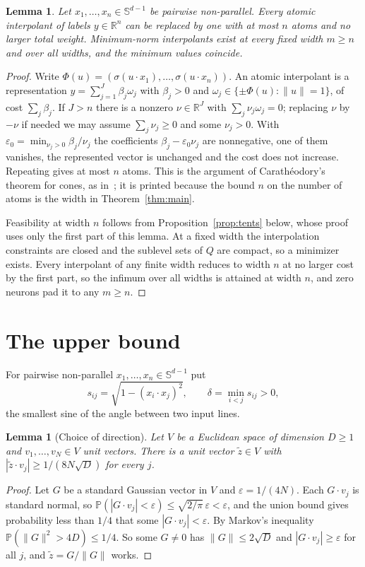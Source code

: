 \documentclass[11pt]{amsart}
\newtheorem{lemma}[theorem]{Lemma}
\theoremstyle{remark}
\numberwithin{equation}{section}
\newcommand{\PP}{\mathbb{P}}
\newcommand{\RR}{\mathbb{R}}
\newcommand{\Sph}{\mathbb{S}^{d-1}}
\begin{document}
\begin{lemma}\label{lem:reduce}
Let $x_1,\dots,x_n\in\Sph$ be pairwise non-parallel. Every atomic interpolant of labels $y\in\RR^n$ can be replaced by one with at most $n$ atoms and no larger total weight. Minimum-norm interpolants exist at every fixed width $m\ge n$ and over all widths, and the minimum values coincide.
\end{lemma}
\begin{proof}
Write $\Phi(u)=(\sigma(u\cdot x_1),\dots,\sigma(u\cdot x_n))$. An atomic interpolant is a representation $y=\sum_{j=1}^J\beta_j\omega_j$ with $\beta_j>0$ and $\omega_j\in\{\pm\Phi(u):\|u\|=1\}$, of cost $\sum_j\beta_j$. If $J>n$ there is a nonzero $\nu\in\RR^J$ with $\sum_j\nu_j\omega_j=0$; replacing $\nu$ by $-\nu$ if needed we may assume $\sum_j\nu_j\ge0$ and some $\nu_j>0$. With $\varepsilon_0=\min_{\nu_j>0}\beta_j/\nu_j$ the coefficients $\beta_j-\varepsilon_0\nu_j$ are nonnegative, one of them vanishes, the represented vector is unchanged and the cost does not increase. Repeating gives at most $n$ atoms. This is the argument of Carath\'eodory's theorem for cones, as in~\cite{Bach}; it is printed because the bound $n$ on the number of atoms is the width in Theorem~\ref{thm:main}.

Feasibility at width $n$ follows from Proposition~\ref{prop:tents} below, whose proof uses only the first part of this lemma. At a fixed width the interpolation constraints are closed and the sublevel sets of $Q$ are compact, so a minimizer exists. Every interpolant of any finite width reduces to width $n$ at no larger cost by the first part, so the infimum over all widths is attained at width $n$, and zero neurons pad it to any $m\ge n$.
\end{proof}

\section{The upper bound}\label{sec:upper}
For pairwise non-parallel $x_1,\dots,x_n\in\Sph$ put
\[
s_{ij}=\sqrt{1-(x_i\cdot x_j)^2},\qquad \delta=\min_{i<j}s_{ij}>0,
\]
the smallest sine of the angle between two input lines.

\begin{lemma}[Choice of direction]\label{lem:tangent}
Let $V$ be a Euclidean space of dimension $D\ge1$ and $v_1,\dots,v_N\in V$ unit vectors. There is a unit vector $\tilde z\in V$ with $|\tilde z\cdot v_j|\ge1/(8N\sqrt D)$ for every $j$.
\end{lemma}
\begin{proof}
Let $G$ be a standard Gaussian vector in $V$ and $\varepsilon=1/(4N)$. Each $G\cdot v_j$ is standard normal, so $\PP(|G\cdot v_j|<\varepsilon)\le\sqrt{2/\pi}\,\varepsilon<\varepsilon$, and the union bound gives probability less than $1/4$ that some $|G\cdot v_j|<\varepsilon$. By Markov's inequality $\PP(\|G\|^2>4D)\le1/4$. So some $G\ne0$ has $\|G\|\le2\sqrt D$ and $|G\cdot v_j|\ge\varepsilon$ for all $j$, and $\tilde z=G/\|G\|$ works.
\end{proof}
\end{document}
